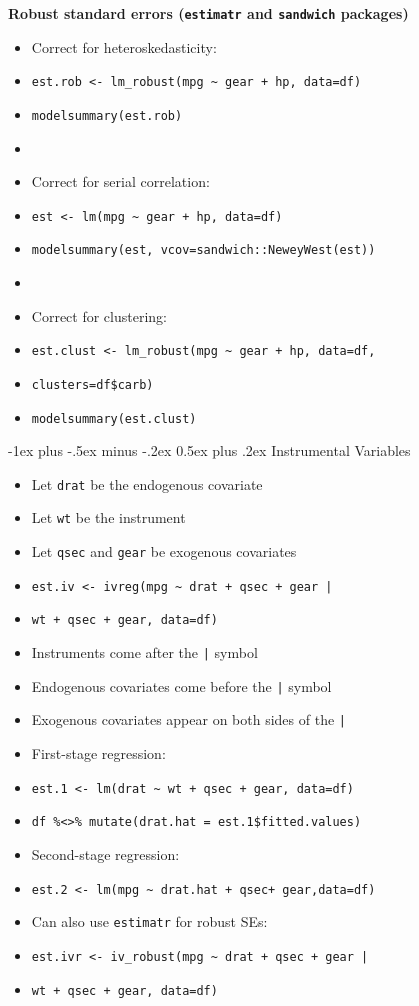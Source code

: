 \documentclass[10pt,landscape]{article}
\makeatletter
\renewcommand{\section}{\@startsection{section}{1}{0mm}%
                                {-1ex plus -.5ex minus -.2ex}%
                                {0.5ex plus .2ex}%
                                {\normalfont\large\bfseries}}
\makeatother
\begin{document}
\begin{multicols}{3}
\textbf{Robust standard errors (\texttt{estimatr} and \texttt{sandwich} packages)}\\
\begin{itemize}
    \item Correct for heteroskedasticity:
    \item[] \verb!est.rob <- lm_robust(mpg ~ gear + hp, data=df)!
    \item[] \verb!modelsummary(est.rob)!
    \item[]
    \item Correct for serial correlation:
    \item[] \verb!est <- lm(mpg ~ gear + hp, data=df)!
    \item[] \verb!modelsummary(est, vcov=sandwich::NeweyWest(est))!
    \item[]
    \item Correct for clustering:
    \item[] \verb!est.clust <- lm_robust(mpg ~ gear + hp, data=df,!
    \item[] \verb!clusters=df$carb)!
    \item[] \verb!modelsummary(est.clust)!
\end{itemize}




\section{Instrumental Variables}

\smallskip{}

\begin{itemize}
    \item Let \verb!drat! be the endogenous covariate
    \item Let \verb!wt! be the instrument
    \item Let \verb!qsec! and \verb!gear! be exogenous covariates
    \item[] \verb!est.iv <- ivreg(mpg ~ drat + qsec + gear | !
    \item[] \verb!wt + qsec + gear, data=df)!
    \item Instruments come after the \verb!|! symbol
    \item Endogenous covariates come before the \verb!|! symbol
    \item Exogenous covariates appear on both sides of the \verb!|!
    \item First-stage regression:
    \item[] \verb!est.1 <- lm(drat ~ wt + qsec + gear, data=df)!
    \item[] \verb!df %<>% mutate(drat.hat = est.1$fitted.values)!
    \item Second-stage regression:
    \item[] \verb!est.2 <- lm(mpg ~ drat.hat + qsec+ gear,data=df)!
    \item Can also use \verb!estimatr! for robust SEs:
    \item[] \verb!est.ivr <- iv_robust(mpg ~ drat + qsec + gear | !
    \item[] \verb!wt + qsec + gear, data=df)!
\end{itemize}





\end{multicols}
\end{document}
